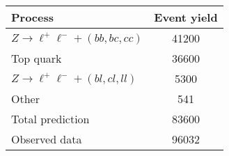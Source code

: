
\begin{tabular}{lS[table-format=5.0(4)]}
  \toprule
  Process & {Event yield} \\
  \midrule
  $Z \to \ell^+\ell^- + (bb,bc,cc)$ & 41200  \\
  Top quark & 36600  \\
  $Z \to \ell^+\ell^- + (bl,cl,ll)$ & 5300  \\
  Other & 541  \\
  \midrule
  Total prediction & 83600  \\
  \midrule
  Observed data & 96032 \\
  \bottomrule
\end{tabular}


